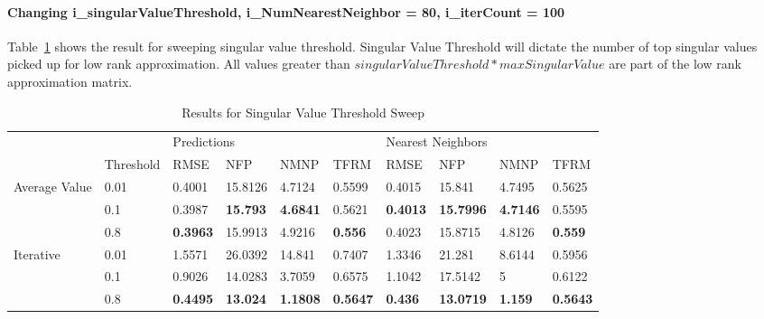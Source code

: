 \paragraph{Changing i\_singularValueThreshold, i\_NumNearestNeighbor = 80, i\_iterCount = 100}
Table~\ref{tab:SingularValueThresholdSweep} shows the result for sweeping singular value threshold. Singular Value Threshold will dictate the number of top singular values picked up for low rank approximation. All values greater than $singularValueThreshold*maxSingularValue$ are part of the low rank approximation matrix.
\begin{table}[]
\centering
\caption{Results for Singular Value Threshold Sweep}
\label{tab:SingularValueThresholdSweep}
\begin{tabular}{|l|l|l|l|l|l|l|l|l|l|}
\hline
\multirow{2}{*}{}                                              &                          & \multicolumn{4}{l|}{Predictions}   & \multicolumn{4}{l|}{Nearest Neighbors} \\ \cline{2-10} 
                                                               & Threshold & RMSE   & NFP     & NMNP   & TFRM   & RMSE    & NFP      & NMNP    & TFRM    \\ \hline
\multicolumn{1}{|c|}{\multirow{3}{*}{Average Value}} & 0.01      & 0.4001 & 15.8126 & 4.7124 & 0.5599 & 0.4015  & 15.841   & 4.7495  & 0.5625  \\ \cline{2-10} 
\multicolumn{1}{|c|}{}                                         & 0.1       & 0.3987 & \textbf{15.793}  & \textbf{4.6841} & 0.5621 & \textbf{0.4013}  & \textbf{15.7996}  & \textbf{4.7146}  & 0.5595  \\ \cline{2-10} 
\multicolumn{1}{|c|}{}                                         & 0.8       & \textbf{0.3963} & 15.9913 & 4.9216 & \textbf{0.556}  & 0.4023  & 15.8715  & 4.8126  & \textbf{0.559}   \\ \hline
\multirow{3}{*}{Iterative}                     & 0.01      & 1.5571 & 26.0392 & 14.841 & 0.7407 & 1.3346  & 21.281   & 8.6144  & 0.5956  \\ \cline{2-10} 
                                                               & 0.1       & 0.9026 & 14.0283 & 3.7059 & 0.6575 & 1.1042  & 17.5142  & 5       & 0.6122  \\ \cline{2-10} 
                                                               & 0.8       & \textbf{0.4495} & \textbf{13.024}  & \textbf{1.1808} & \textbf{0.5647} & \textbf{0.436}   & \textbf{13.0719}  & \textbf{1.159}   & \textbf{0.5643}  \\ \hline
\end{tabular}
\end{table}

